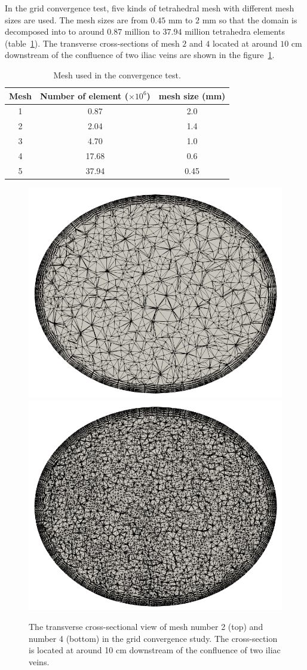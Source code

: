In the grid convergence test, five kinds of tetrahedral mesh with different mesh sizes are used. The mesh sizes are from $0.45$ mm to $2$ mm so that the domain is decomposed into to around $0.87$ million to $37.94$ million tetrahedra elements (table~\ref{tab:meshsize}). The transverse cross-sections of mesh $2$ and $4$ located at around $10$ cm downstream of the confluence of two iliac veins are shown in the figure~\ref{fig:IVCmesh}.

\begin{table}[h]
\caption {Mesh used in the convergence test.} \label{tab:meshsize}
\centering
\begin{tabular}{|c|c|c|}
\hline
Mesh & Number of element ($\times10^6$)& mesh size (mm) \\ \hline
1    & 0.87              & 2.0              \\ \hline
2    & 2.04              & 1.4            \\ \hline
3    & 4.70              & 1.0               \\ \hline
4    & 17.68             & 0.6            \\ \hline
5    & 37.94             & 0.45            \\ \hline
\end{tabular}
\end{table}

\begin{figure}[h]\centering
    \includegraphics[width=0.5\linewidth]{imgs/vena_cava/mesh2_fixed.png}
    \includegraphics[width=0.5\linewidth]{imgs/vena_cava/mesh4.png}
    \caption{The transverse cross-sectional view of mesh number 2 (top) and number 4 (bottom) in the grid convergence study. The cross-section is located at around 10 cm downstream of the confluence of two iliac veins.}
    \label{fig:IVCmesh}
\end{figure}

